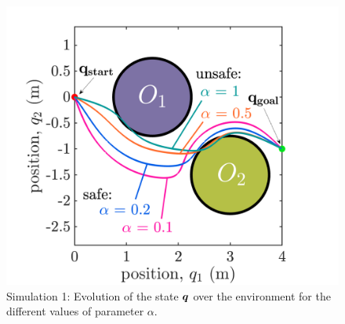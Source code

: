 \begin{figure}[h]
    \centering
    \includegraphics[scale=0.5]{../figures/sim1map.pdf}
    \caption{Simulation 1: Evolution of the state ${\boldsymbol{q}}$ over the environment for the different values of parameter $\alpha$.}
    \label{fig:sim1map}
\end{figure}




